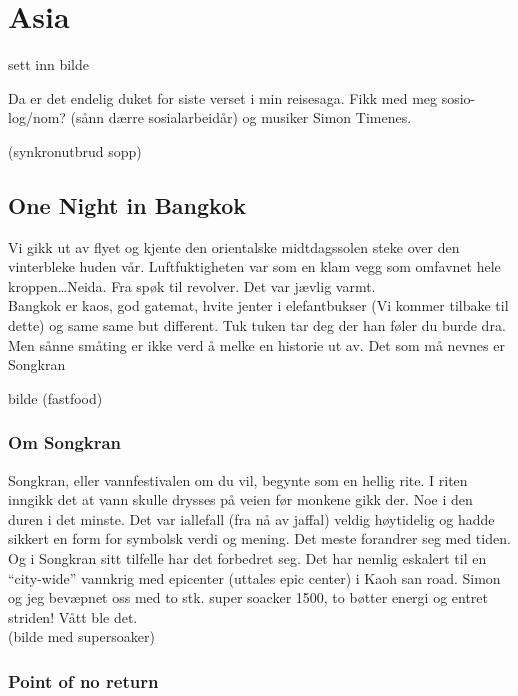 \chapter{Asia}

sett inn bilde


Da er det endelig duket for siste verset i min reisesaga. Fikk med meg
sosio-log/nom? (sånn dærre sosialarbeidår) og musiker Simon Timenes.  

(synkronutbrud sopp)
\section{One Night in Bangkok}

Vi gikk ut av flyet og kjente den orientalske midtdagssolen steke over
den vinterbleke huden vår. Luftfuktigheten var som en klam vegg som
omfavnet hele kroppen\ldots Neida. Fra spøk til revolver. Det var
jævlig varmt.\\

Bangkok er kaos, god gatemat, hvite jenter i elefantbukser (Vi
kommer tilbake til dette) og same same but different. Tuk tuken tar
deg der han føler du burde dra. Men sånne småting er ikke verd å melke
en historie ut av. Det som må nevnes er Songkran

bilde (fastfood)

\subsection{Om Songkran}

Songkran, eller vannfestivalen om du vil, begynte som en hellig rite.
I riten inngikk det at vann skulle drysses på veien før monkene
gikk der. Noe i den duren i det minste. Det var iallefall (fra nå av
jaffal) veldig høytidelig og
hadde sikkert en form for symbolsk verdi og mening. Det meste
forandrer seg med tiden. Og i Songkran sitt tilfelle har det forbedret seg. Det har nemlig eskalert til en ``city-wide''
vannkrig med epicenter (uttales epic center) i Kaoh san road. Simon og jeg
bevæpnet oss med to stk. super soacker 1500, to bøtter energi og
entret striden! Vått ble det.\\

(bilde med supersoaker)

\subsection{Point of no return}

